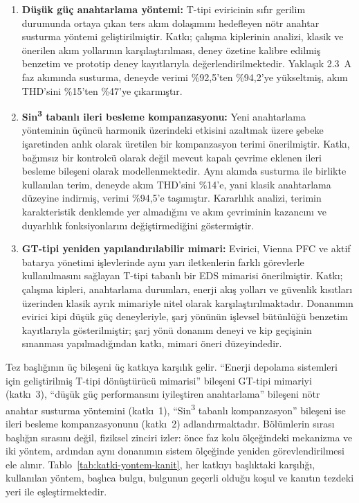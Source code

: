 \begin{enumerate}
  \item \textbf{Düşük güç anahtarlama yöntemi:} T-tipi eviricinin sıfır gerilim durumunda ortaya çıkan ters akım dolaşımını hedefleyen nötr anahtar susturma yöntemi geliştirilmiştir. Katkı; çalışma kiplerinin analizi, klasik ve önerilen akım yollarının karşılaştırılması, deney özetine kalibre edilmiş benzetim ve prototip deney kayıtlarıyla değerlendirilmektedir. Yaklaşık \SI{2.3}{\ampere} faz akımında susturma, deneyde verimi \%92,5'ten \%94,2'ye yükseltmiş, akım THD'sini \%15'ten \%47'ye çıkarmıştır.
  \item \textbf{Sin\textsuperscript{3} tabanlı ileri besleme kompanzasyonu:} Yeni anahtarlama yönteminin üçüncü harmonik üzerindeki etkisini azaltmak üzere şebeke işaretinden anlık olarak üretilen bir kompanzasyon terimi önerilmiştir. Katkı, bağımsız bir kontrolcü olarak değil mevcut kapalı çevrime eklenen ileri besleme bileşeni olarak modellenmektedir. Aynı akımda susturma ile birlikte kullanılan terim, deneyde akım THD'sini \%14'e, yani klasik anahtarlama düzeyine indirmiş, verimi \%94,5'e taşımıştır. Kararlılık analizi, terimin karakteristik denklemde yer almadığını ve akım çevriminin kazancını ve duyarlılık fonksiyonlarını değiştirmediğini göstermiştir.
  \item \textbf{GT-tipi yeniden yapılandırılabilir mimari:} Evirici, Vienna PFC ve aktif batarya yönetimi işlevlerinde aynı yarı iletkenlerin farklı görevlerle kullanılmasını sağlayan T-tipi tabanlı bir EDS mimarisi önerilmiştir. Katkı; çalışma kipleri, anahtarlama durumları, enerji akış yolları ve güvenlik kısıtları üzerinden klasik ayrık mimariyle nitel olarak karşılaştırılmaktadır. Donanımın evirici kipi düşük güç deneyleriyle, şarj yönünün işlevsel bütünlüğü benzetim kayıtlarıyla gösterilmiştir; şarj yönü donanım deneyi ve kip geçişinin sınanması yapılmadığından katkı, mimari öneri düzeyindedir.
\end{enumerate}

Tez başlığının üç bileşeni üç katkıya karşılık gelir. ``Enerji depolama sistemleri için geliştirilmiş T-tipi dönüştürücü mimarisi'' bileşeni GT-tipi mimariyi (katkı~3), ``düşük güç performansını iyileştiren anahtarlama'' bileşeni nötr anahtar susturma yöntemini (katkı~1), ``Sin\textsuperscript{3} tabanlı kompanzasyon'' bileşeni ise ileri besleme kompanzasyonunu (katkı~2) adlandırmaktadır. Bölümlerin sırası başlığın sırasını değil, fiziksel zinciri izler: önce faz kolu ölçeğindeki mekanizma ve iki yöntem, ardından aynı donanımın sistem ölçeğinde yeniden görevlendirilmesi ele alınır. Tablo~\ref{tab:katki-yontem-kanit}, her katkıyı başlıktaki karşılığı, kullanılan yöntem, başlıca bulgu, bulgunun geçerli olduğu koşul ve kanıtın tezdeki yeri ile eşleştirmektedir.

